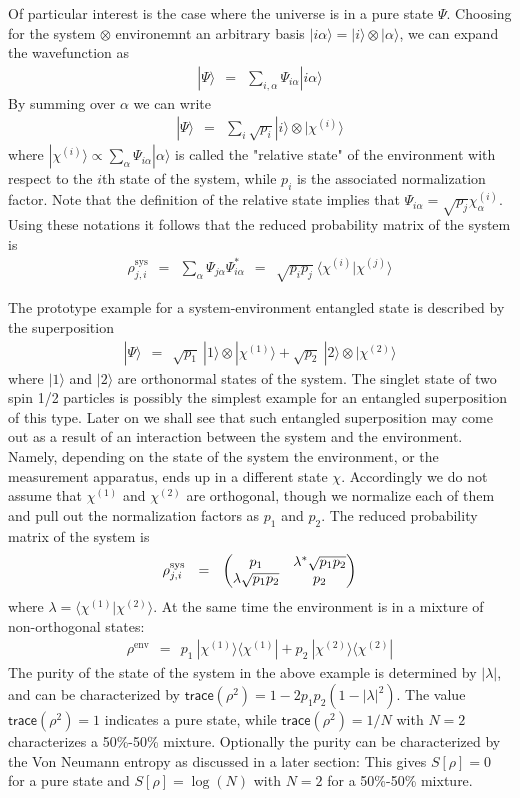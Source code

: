 \documentclass[onecolumn,fleqn, 11pt]{revtex4}
\newcommand{\trc}{\mathsf{trace}}
\newcommand{\tbox}[1]{\text{#1}}
\newcommand{\amatrix}[1]{\begin{matrix} #1 \end{matrix}}
\newcommand{\beq}{\begin{eqnarray}}
\newcommand{\eeq}{\end{eqnarray}}
\begin{document}
Of particular interest is the case where the universe  
is in a pure state $\Psi$. Choosing for the system $\otimes$ environemnt  
an arbitrary basis ${|i\alpha\rangle = |i\rangle \otimes |\alpha\rangle }$,  
we can expand the wavefunction as 
\beq
|\Psi\rangle  \ \ = \ \ \sum_{i,\alpha} \Psi_{i\alpha} |i\alpha\rangle
\eeq
By summing over $\alpha$ we can write
\beq
|\Psi\rangle \ \ = \ \ \sum_{i} \sqrt{p_i} |i\rangle \otimes | \chi^{(i)} \rangle
\eeq
where $| \chi^{(i)} \rangle \propto \sum_{\alpha} \Psi_{i\alpha} |\alpha\rangle$ 
is called the "relative state" of the environment with respect 
to the $i$th state of the system, while $p_i$ is the associated normalization factor.
Note that the definition of the relative state implies 
that ${\Psi_{i\alpha} = \sqrt{p_j} \chi^{(i)}_{\alpha}}$. 
Using these notations it follows that the reduced probability matrix of the system is 
\beq
\rho^{\tbox{sys}}_{j,i} 
\ \ = \ \  
\sum_{\alpha} \Psi_{j\alpha}\Psi_{i\alpha}^* 
\ \ = \ \ 
\sqrt{p_ip_j} \ \langle \chi^{(i)} | \chi^{(j)} \rangle
\eeq



The prototype example for a system-environment entangled state 
is described by the superposition  
\beq
|\Psi\rangle \ \ = \ \ 
\sqrt{p_1}\ |1\rangle \otimes |\chi^{(1)}\rangle 
+  \sqrt{p_2}\ |2\rangle \otimes |\chi^{(2)}\rangle
\eeq
where $|1\rangle$ and $|2\rangle$ are orthonormal states of the system. 
The singlet state of two spin 1/2 particles is possibly the simplest 
example for an entangled superposition of this type. 
Later on we shall see that such entangled superposition may come out as 
a result of an interaction between the system and the environment. 
Namely, depending on the state of the system the environment, 
or the measurement apparatus, ends up in a different state $\chi$.
Accordingly we do not assume that $\chi^{(1)}$ and $\chi^{(2)}$ are orthogonal, 
though we normalize each of them and pull out the normalization 
factors as $p_1$ and $p_2$. The reduced probability matrix of the system is 
\beq
\rho^{\tbox{sys}}_{j,i} 
\ \ = \ \ 
\left(\amatrix{ 
p_1 & \lambda^* \sqrt{p_1p_2} \cr
\lambda \sqrt{p_1p_2} & p_2
}\right)
\eeq
where ${\lambda=\langle \chi^{(1)} | \chi^{(2)} \rangle}$. 
At the same time the environment is in a mixture 
of non-orthogonal states:  
\beq
\rho^{\tbox{env}}
\ \ = \ \ 
p_1 \ |\chi^{(1)}\rangle\langle \chi^{(1)}| 
+ p_2 \ |\chi^{(2)}\rangle\langle \chi^{(2)}|  
\eeq
The purity of the state of the system in the above 
example is determined by $|\lambda|$, and can be 
characterized by ${\trc(\rho^2)=1-2p_1p_2(1{-}|\lambda|^2)}$. 
The value ${\trc(\rho^2)=1}$ indicates a pure state, 
while ${\trc(\rho^2)=1/N}$ with ${N=2}$ 
characterizes a 50\%-50\% mixture.
Optionally the purity can be characterized by 
the Von Neumann entropy as discussed in a later section:  
This gives $S[\rho]=0$ for a pure state and ${S[\rho]=\log(N)}$ 
with ${N=2}$ for a 50\%-50\% mixture.
\end{document}
